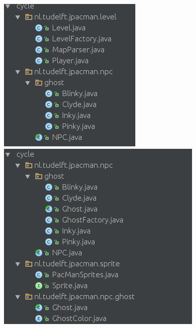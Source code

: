 \documentclass[12pt, openany]{report}
\begin{document}
\begin{figure}[!h]
	\centering
	\includegraphics[scale=0.5]{Images/DependencyCycle3.png}
	\includegraphics[scale=0.5]{Images/DependencyCycle4.png}  
	\label{DependencyCycle1}
\end{figure}
\end{document}
